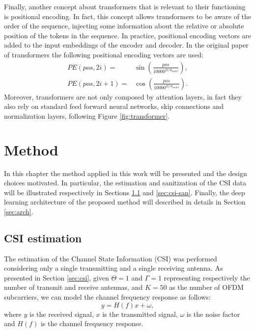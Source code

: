 \documentclass[binding=0.6cm,noexaminfo]{sapthesis}
\begin{document}
Finally, another concept about transformers that is relevant to their functioning is positional encoding. In fact, this concept allows transformers to be aware of the order of the sequence, injecting some information about the relative or absolute position of the tokens in the sequence. In practice, positional encoding vectors are added to the input embeddings of the encoder and decoder. In the original paper of transformers the following positional encoding vectors are used:
\begin{equation}
\begin{split}
PE(pos, 2i) = &\sin \left( \frac{pos}{10000^{2i / d_{model}}} \right), \\
PE(pos, 2i+1) = &\cos\left( \frac{pos}{10000^{2i / d_{model}}} \right).
\end{split}
\end{equation}
Moreover, transformers are not only composed by attention layers, in fact they also rely on standard feed forward neural networks, skip connections and normalization layers, following Figure \ref{fig:transformer}.


\chapter{Method}\label{cap:method}
In this chapter the method applied in this work will be presented and the design choices motivated. In particular, the estimation and sanitization of the CSI data will be illustrated respectively in Sections \ref{sec:csi-est} and \ref{sec:csi-san}. Finally, the deep learning architecture of the proposed method will described in details in Section \ref{sec:arch}.

\section{CSI estimation}\label{sec:csi-est}

The estimation of the Channel State Information (CSI) was performed considering only a single transmitting and a single receiving antenna. As presented in Section \ref{sec:csi}, given $\Theta = 1$ and $\Gamma = 1$ representing respectively the number of transmit and receive antennas, and $K = 50$ as the number of OFDM subcarriers, we can model the channel frequency response as follows:
\begin{equation}
y = H(f) x + \omega,
\end{equation}
where $y$ is the received signal, $x$ is the transmitted signal, $\omega$ is the noise factor and $H(f)$ is the channel frequency response.
\end{document}
